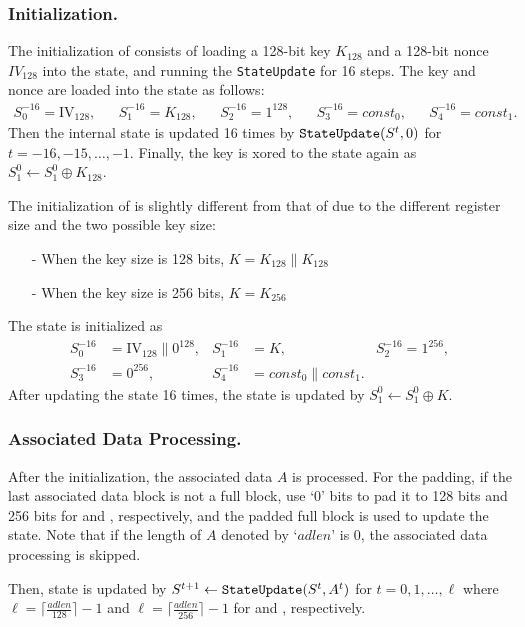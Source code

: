 \subsubsection{Initialization.}
The initialization of  consists of loading a 128-bit key $K_{128}$ and a 128-bit nonce $IV_{128}$ into the state, and running the {\tt StateUpdate} for 16 steps. The key and nonce are loaded into the state as follows:
\begin{align*}
S^{-16}_0 = \textrm{IV}_{128}, &&
S^{-16}_1 = K_{128}, &&
S^{-16}_2 = 1^{128}, &&
S^{-16}_3 = const_0, &&
S^{-16}_4 = const_1.
\end{align*}
Then the internal state is updated 16 times by  ${\tt StateUpdate}(S^t,0)$ for $t=-16,-15,\ldots,-1$. Finally, the key is xored to the state again as $S^0_1 \leftarrow S^0_1 \oplus K_{128}$.

The initialization of  is slightly different from that of  due to the different register size and the two possible key size:
\begin{itemize}
  \item[-] When the key size is 128 bits, $K = K_{128} \|K_{128}$
  \item[-] When the key size is 256 bits, $K = K_{256}$
\end{itemize}
The state is initialized as
\begin{align*}
S^{-16}_0 &= \textrm{IV}_{128} \| 0^{128}, &
S^{-16}_1 &= K, &
S^{-16}_2 = 1^{256}, \\
S^{-16}_3 &= 0^{256}, &
S^{-16}_4 &= const_0\|const_1.
\end{align*}
After updating the state 16 times, the state is updated by $S^0_1 \leftarrow S^0_1 \oplus K$.


\subsubsection{Associated Data Processing.}
After the initialization, the associated data $A$ is processed. For the padding, if the last associated data block is not a full block, use `0' bits to pad it to 128 bits and 256 bits for  and , respectively, and the padded full block is used to update the state. Note that if the length of $A$ denoted by `$adlen$' is 0, the associated data processing is skipped.

Then, state is updated by $S^{t+1} \leftarrow {\tt StateUpdate}(S^t, A^t)$ for $t=0,1,\ldots,\ell$ where $\ell = \lceil \frac{adlen}{128} \rceil -1$ and $\ell = \lceil \frac{adlen}{256} \rceil -1$ for  and , respectively.

